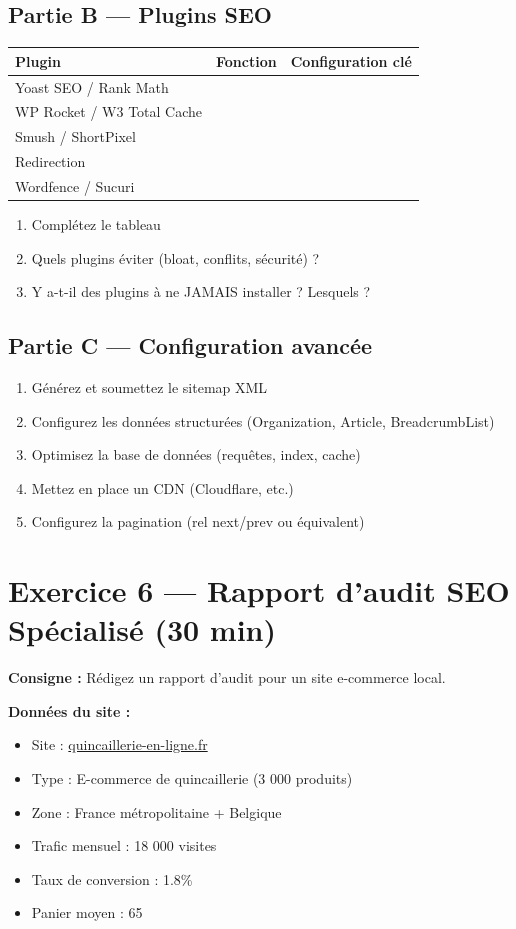 \documentclass[12pt,a4paper]{report}
\begin{document}
\subsection{Partie B --- Plugins SEO}

\begin{longtable}{|l|l|l|}
\hline
\textbf{Plugin} & \textbf{Fonction} & \textbf{Configuration clé} \\
\hline
Yoast SEO / Rank Math & & \\
\hline
WP Rocket / W3 Total Cache & & \\
\hline
Smush / ShortPixel & & \\
\hline
Redirection & & \\
\hline
Wordfence / Sucuri & & \\
\hline
\end{longtable}

\begin{enumerate}
\item Complétez le tableau
\item Quels plugins éviter (bloat, conflits, sécurité) ?
\item Y a-t-il des plugins à ne JAMAIS installer ? Lesquels ?
\end{enumerate}

\subsection{Partie C --- Configuration avancée}
\begin{enumerate}
\item Générez et soumettez le sitemap XML
\item Configurez les données structurées (Organization, Article, BreadcrumbList)
\item Optimisez la base de données (requêtes, index, cache)
\item Mettez en place un CDN (Cloudflare, etc.)
\item Configurez la pagination (rel next/prev ou équivalent)
\end{enumerate}

\section{Exercice 6 --- Rapport d'audit SEO Spécialisé (30 min)}

\textbf{Consigne :} Rédigez un rapport d'audit pour un site e-commerce local.

\textbf{Données du site :}
\begin{itemize}
\item Site : \url{quincaillerie-en-ligne.fr}
\item Type : E-commerce de quincaillerie (3 000 produits)
\item Zone : France métropolitaine + Belgique
\item Trafic mensuel : 18 000 visites
\item Taux de conversion : 1.8\%
\item Panier moyen : 65 \texteuro{}
\end{itemize}
\end{document}
